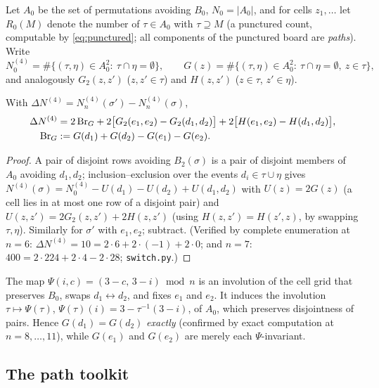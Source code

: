 Let $A_0$ be the set of permutations avoiding $B_0$, $N_0=|A_0|$, and for
cells $z_1,\dots$ let $R_0(M)$ denote the number of $\tau\in A_0$ with
$\tau\supseteq M$ (a punctured count, computable by
\eqref{eq:punctured}; all components of the punctured board are
\emph{paths}).  Write
\[
N^{(4)}_0=\#\{(\tau,\eta)\in A_0^2:\ \tau\cap\eta=\emptyset\},\qquad
G(z)=\#\{(\tau,\eta)\in A_0^2:\ \tau\cap\eta=\emptyset,\ z\in\tau\},
\]
and analogously $G_2(z,z')$ ($z,z'\in\tau$) and $H(z,z')$ ($z\in\tau$,
$z'\in\eta$).

\begin{lemma}\label{lem:switchIE}
With $\Delta N^{(4)}=N^{(4)}_n(\sigma')-N^{(4)}_n(\sigma)$,
\begin{align}
\Delta N^{(4)}
&=2\,\mathrm{Br}_G
+2\bigl[G_2(e_1,e_2)-G_2(d_1,d_2)\bigr]
+2\bigl[H(e_1,e_2)-H(d_1,d_2)\bigr],
\label{eq:switchIE}\\
\mathrm{Br}_G&:=G(d_1)+G(d_2)-G(e_1)-G(e_2).\notag
\end{align}
\end{lemma}

\begin{proof}
A pair of disjoint rows avoiding $B_2(\sigma)$ is a pair of disjoint
members of $A_0$ avoiding $d_1,d_2$; inclusion--exclusion over the events
$d_i\in\tau\cup\eta$ gives
$N^{(4)}(\sigma)=N^{(4)}_0-U(d_1)-U(d_2)+U(d_1,d_2)$ with
$U(z)=2G(z)$ (a cell lies in at most one row of a disjoint pair) and
$U(z,z')=2G_2(z,z')+2H(z,z')$ (using $H(z,z')=H(z',z)$, by swapping
$\tau,\eta$).  Similarly for $\sigma'$ with $e_1,e_2$; subtract.
(Verified by complete enumeration at $n=6$: $\Delta N^{(4)}=10=
2\cdot6+2\cdot(-1)+2\cdot0$; and $n=7$: $400=2\cdot224+2\cdot4-2\cdot28$;
\texttt{switch.py}.)
\end{proof}

\begin{remark}\label{rem:psi}
The map $\Psi(i,c)=(3-c,\,3-i)\bmod n$ is an involution of the cell grid
that preserves $B_0$, swaps $d_1\leftrightarrow d_2$, and fixes $e_1$ and
$e_2$.  It induces the involution
$\tau\mapsto\Psi(\tau)$, $\Psi(\tau)(i)=3-\tau^{-1}(3-i)$, of $A_0$,
which preserves disjointness of pairs.  Hence $G(d_1)=G(d_2)$
\emph{exactly} (confirmed by exact computation at $n=8,\dots,11$), while
$G(e_1)$ and $G(e_2)$ are merely each $\Psi$-invariant.
\end{remark}

\subsection{The path toolkit}

